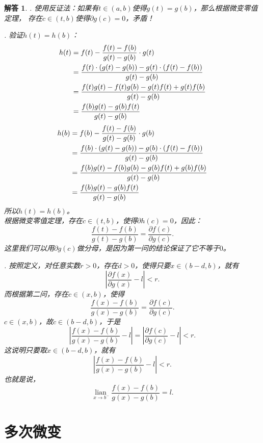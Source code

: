 \documentclass[12pt,UTF8]{ctexbook}
\newcommand{\lian}[1]{
    \underset{#1}{\operatorname{lian}\,}
}
\newtheorem*{so}{解答}
\begin{document}
\begin{so}
    . 使用反证法：如果有$t\in(a, b)$使得$g(t) = g(b)$，那么根据微变零值定理，
    存在$c\in(t, b)$使得$\partial g(c) = 0$，矛盾！

    . 验证$h(t) = h(b)$：
    \begin{align}
        h(t) &= f(t) - \frac{f(t) - f(b)}{g(t) - g(b)} \cdot g(t) \notag \\
        &= \frac{f(t)\cdot \left(g(t) - g(b)\right) - g(t) \cdot \left(f(t) - f(b)\right)}{g(t) - g(b)} \notag \\
        &= \frac{f(t) g(t) - f(t) g(b) - g(t) f(t) + g(t) f(b)}{g(t) - g(b)} \notag \\
        &= \frac{f(b) g(t) - g(b) f(t)}{g(t) - g(b)} \notag 
    \end{align}
    \begin{align}
        h(b) &= f(b) - \frac{f(t) - f(b)}{g(t) - g(b)} \cdot g(b) \notag \\
        &= \frac{f(b)\cdot \left(g(t) - g(b)\right) - g(b) \cdot \left(f(t) - f(b)\right)}{g(t) - g(b)} \notag \\
        &= \frac{f(b) g(t) - f(b) g(b) - g(b) f(t) + g(b) f(b)}{g(t) - g(b)} \notag \\
        &= \frac{f(b) g(t) - g(b) f(t)}{g(t) - g(b)} \notag 
    \end{align}
    所以$h(t) = h(b)$。\\
    根据微变零值定理，存在$c\in(t, b)$，使得$\partial h(c) = 0$，因此：
    $$ \frac{f(t) - f(b)}{g(t) - g(b)} = \frac{\partial f(c)}{\partial g(c)}. $$
    这里我们可以用$\partial g(c)$做分母，是因为第一问的结论保证了它不等于$0$。

    . 按照定义，对任意实数$r > 0$，存在$d > 0$，使得只要$x\in(b - d, b)$，就有
    $$ \left| \frac{\partial f(x)}{\partial g(x)} - l\right| < r.$$
    而根据第二问，存在$c\in(x, b)$，使得
    $$ \frac{f(x) - f(b)}{g(x) - g(b)} = \frac{\partial f(c)}{\partial g(c)}. $$
    $c\in(x, b)$，故$c\in(b - d, b)$，于是
    $$ \left| \frac{f(x) - f(b)}{g(x) - g(b)} - l\right| = \left| \frac{\partial f(c)}{\partial g(c)} - l\right| < r.$$
    这说明只要取$x\in(b - d, b)$，就有
    $$ \left| \frac{f(x) - f(b)}{g(x) - g(b)} - l\right| < r.$$
    也就是说，
    $$ \lian{x\to b^-}  \frac{f(x) - f(b)}{g(x) - g(b)} = l. $$

\end{so}

\section{多次微变}
\end{document}
